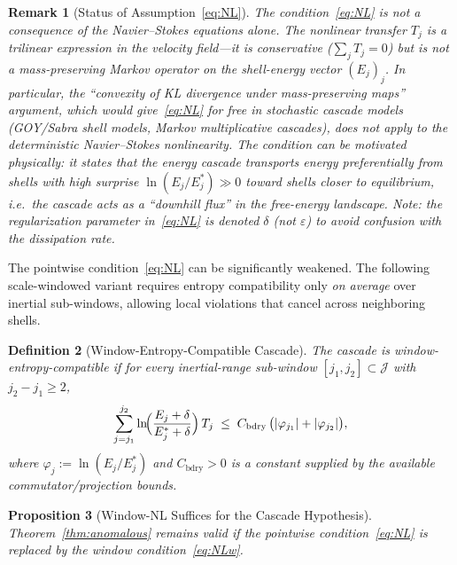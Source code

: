\documentclass[12pt,a4paper]{article}
\theoremstyle{breakdef}
\newtheorem{definition}{Definition}[section]
\theoremstyle{breakplain}
\newtheorem{proposition}[definition]{Proposition}
\theoremstyle{breakdef}
\newtheorem{remark}[definition]{Remark}
\begin{document}
\begin{remark}[Status of Assumption~\eqref{eq:NL}]
The condition~\eqref{eq:NL} is \emph{not} a consequence of the Navier--Stokes
equations alone.  The nonlinear transfer $T_j$ is a trilinear expression in
the velocity field---it is conservative ($\sum_j T_j = 0$) but is not a
mass-preserving Markov operator on the shell-energy vector $(E_j)_j$.
In particular, the ``convexity of KL divergence under mass-preserving maps''
argument, which would give~\eqref{eq:NL} for free in stochastic cascade
models (GOY/Sabra shell models, Markov multiplicative cascades), does not
apply to the deterministic Navier--Stokes nonlinearity.  The condition
can be motivated physically: it states that the energy cascade transports
energy preferentially from shells with high surprise
$\ln(E_j/E_j^*) \gg 0$ toward shells closer to equilibrium, i.e.\
the cascade acts as a ``downhill flux'' in the free-energy landscape.
Note: the regularization parameter in~\eqref{eq:NL} is denoted $\delta$
(not $\varepsilon$) to avoid confusion with the dissipation rate.
\end{remark}

The pointwise condition~\eqref{eq:NL} can be significantly weakened.
The following scale-windowed variant requires entropy compatibility
only \emph{on average} over inertial sub-windows, allowing local
violations that cancel across neighboring shells.

\begin{definition}[Window-Entropy-Compatible Cascade]\label{def:NLw}
The cascade is \emph{window-entropy-compatible} if for every
inertial-range sub-window $[j_1, j_2] \subset \mathcal{J}$ with
$j_2 - j_1 \ge 2$,
\begin{equation}\label{eq:NLw}
  \sum_{j=j_1}^{j_2}
  \ln\!\Bigl(\frac{E_j + \delta}{E_j^* + \delta}\Bigr)\,T_j
  \;\le\;
  C_{\mathrm{bdry}}\,
  \bigl(|\varphi_{j_1}| + |\varphi_{j_2}|\bigr),
\end{equation}
where $\varphi_j := \ln(E_j/E_j^*)$ and $C_{\mathrm{bdry}} > 0$ is a
constant supplied by the available commutator/projection bounds.
\end{definition}

\begin{proposition}[Window-NL Suffices for the Cascade Hypothesis]
\label{prop:window-NL}
Theorem~\ref{thm:anomalous} remains valid if the pointwise
condition~\eqref{eq:NL} is replaced by the window
condition~\eqref{eq:NLw}.
\end{proposition}
\end{document}
